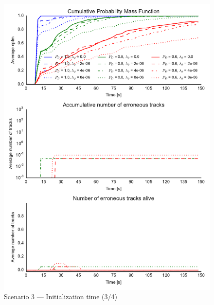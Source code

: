 \begin{figure}
\centering
\includegraphics{Figures/plots/Scenario3_Init-Time(3-4).pdf}
\caption{Scenario 3 --- Initialization time (3/4)}\label{fig:init3_time_3-4}
\end{figure}

